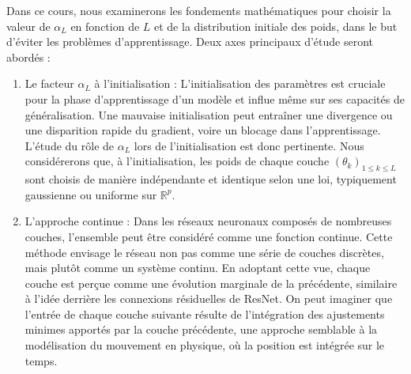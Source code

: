 Dans ce cours, nous examinerons les fondements mathématiques pour choisir la valeur de $\alpha_L$ en fonction de $L$ et de la distribution initiale des poids, dans le but d'éviter les problèmes d'apprentissage. Deux axes principaux d'étude seront abordés :
\begin{enumerate}
    \item Le facteur $\alpha_L$ à l'initialisation : L'initialisation des paramètres est cruciale pour la phase d'apprentissage d'un modèle et influe même sur ses capacités de généralisation. Une mauvaise initialisation peut entraîner une divergence ou une disparition rapide du gradient, voire un blocage dans l'apprentissage. L'étude du rôle de $\alpha_L$ lors de l'initialisation est donc pertinente. Nous considérerons que, à l'initialisation, les poids de chaque couche $(\theta_k)_{1 \leqslant k \leqslant L}$ sont choisis de manière indépendante et identique selon une loi, typiquement gaussienne ou uniforme sur $\mathbb{R}^p$. 
    \item L'approche continue : Dans les réseaux neuronaux composés de nombreuses couches, l'ensemble peut être considéré comme une fonction continue. Cette méthode envisage le réseau non pas comme une série de couches discrètes, mais plutôt comme un système continu. En adoptant cette vue, chaque couche est perçue comme une évolution marginale de la précédente, similaire à l'idée derrière les connexions résiduelles de ResNet. On peut imaginer que l'entrée de chaque couche suivante résulte de l'intégration des ajustements minimes apportés par la couche précédente, une approche semblable à la modélisation du mouvement en physique, où la position est intégrée sur le temps.\\

\end{enumerate}
